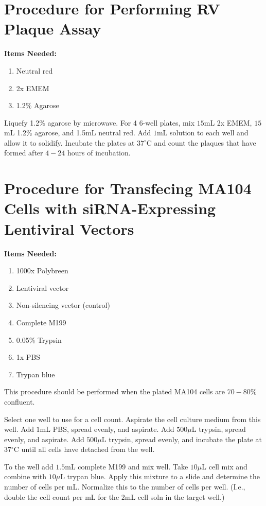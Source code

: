 \section{Procedure for Performing RV Plaque Assay}

{\bfseries Items Needed:} \begin{enumerate}
	\item Neutral red
	\item 2x EMEM
	\item 1.2\% Agarose
\end{enumerate}

Liquefy 1.2\% agarose by microwave. For 4 6-well plates, mix $15$mL 2x EMEM, $15$mL 1.2\% agarose, and 1.5mL neutral red. Add $1$mL solution to each well and allow it to solidify. Incubate the plates at $37^{\circ}$C and count the plaques that have formed after $4-24$ hours of incubation.

\section{Procedure for Transfecing MA104 Cells with siRNA-Expressing Lentiviral Vectors}

{\bfseries Items Needed:} \begin{enumerate}
	\item 1000x Polybreen
	\item Lentiviral vector
	\item Non-silencing vector (control)
	\item Complete M199
	\item 0.05\% Trypsin
	\item 1x PBS
	\item Trypan blue
\end{enumerate}

This procedure should be performed when the plated MA104 cells are $70-80\%$ confluent.

Select one well to use for a cell count. Aspirate the cell culture medium from this well. Add $1$mL PBS, spread evenly, and aspirate. Add $500\mu$L trypsin, spread evenly, and aspirate. Add $500\mu$L trypsin, spread evenly, and incubate the plate at $37{^\circ}$C until all cells have detached from the well.

To the well add $1.5$mL complete M199 and mix well. Take $10\mu$L cell mix and combine with $10\mu$L trypan blue. Apply this mixture to a slide and determine the number of cells per mL. Normalize this to the number of cells per well. (I.e., double the cell count per mL for the $2$mL cell soln in the target well.)

